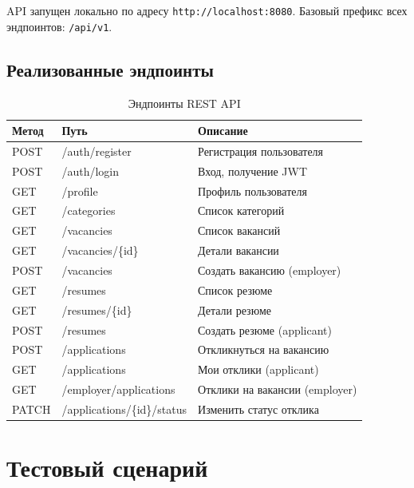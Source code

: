﻿\documentclass[a4paper,14pt]{extarticle}
\begin{document}
API запущен локально по адресу \texttt{http://localhost:8080}.
Базовый префикс всех эндпоинтов: \texttt{/api/v1}.

\subsection{Реализованные эндпоинты}

\begin{table}[H]
\centering
\caption{Эндпоинты REST API}
\begin{tabularx}{\textwidth}{llX}
\toprule
\textbf{Метод} & \textbf{Путь} & \textbf{Описание} \\
\midrule
POST   & /auth/register                       & Регистрация пользователя \\
POST   & /auth/login                          & Вход, получение JWT \\
GET    & /profile                             & Профиль пользователя \\
GET    & /categories                          & Список категорий \\
GET    & /vacancies                           & Список вакансий \\
GET    & /vacancies/\{id\}                    & Детали вакансии \\
POST   & /vacancies                           & Создать вакансию (employer) \\
GET    & /resumes                             & Список резюме \\
GET    & /resumes/\{id\}                      & Детали резюме \\
POST   & /resumes                             & Создать резюме (applicant) \\
POST   & /applications                        & Откликнуться на вакансию \\
GET    & /applications                        & Мои отклики (applicant) \\
GET    & /employer/applications               & Отклики на вакансии (employer) \\
PATCH  & /applications/\{id\}/status          & Изменить статус отклика \\
\bottomrule
\end{tabularx}
\end{table}

\section{Тестовый сценарий}
\end{document}
